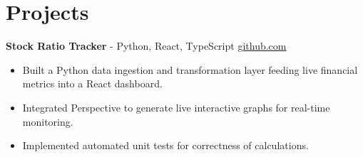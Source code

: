 \documentclass[11pt]{article}       %
\begin{document}

\vspace{-18.5pt}

\section*{Projects}

\textbf{Stock Ratio Tracker}{ - Python, React, TypeScript} \hfill \href{https://github.com/Monica20030707/Trading-Dashboard_UI}{github.com} \\
\vspace{-9pt}
\begin{itemize}
  \item Built a Python data ingestion and transformation layer feeding live financial metrics into a React dashboard.
  \item Integrated Perspective to generate live interactive graphs for real-time monitoring.
  \item Implemented automated unit tests for correctness of calculations.
\end{itemize}
\end{document}
